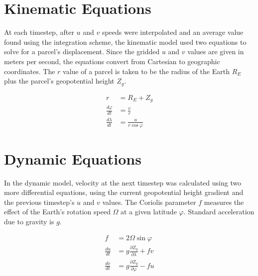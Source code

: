 \section{Kinematic Equations}
At each timestep, after $u$ and $v$ speeds were interpolated and an average value found using the integration scheme, the kinematic model used two equations to solve for a parcel's displacement. 
Since the gridded $u$ and $v$ values are given in meters per second, the equations convert from Cartesian to geographic coordinates. 
The $r$ value of a parcel is taken to be the radius of the Earth $R_E$ plus the parcel's geopotential height $Z_g$.

\begin{align}
r &= R_E + Z_g \\
\frac{d \varphi}{dt} &= \frac{v}{r} \\
\frac{d \lambda}{dt} &= \frac{u}{r \cos{\varphi}}
\end{align}

\section{Dynamic Equations}
In the dynamic model, velocity at the next timestep was calculated using two more differential equations, using the current geopotential height gradient and the previous timestep's $u$ and $v$ values.
The Coriolis parameter $f$ measures the effect of the Earth's rotation speed $\Omega$ at a given latitude $\varphi$.
Standard acceleration due to gravity is $g$. 

\begin{align}
f &= 2 \Omega \sin{\varphi} \\
\frac{du}{dt} &= g \frac{\partial Z_g}{\partial \lambda} + fv \\
\frac{dv}{dt} &= g \frac{\partial Z_g}{\partial \varphi} - fu
\end{align}